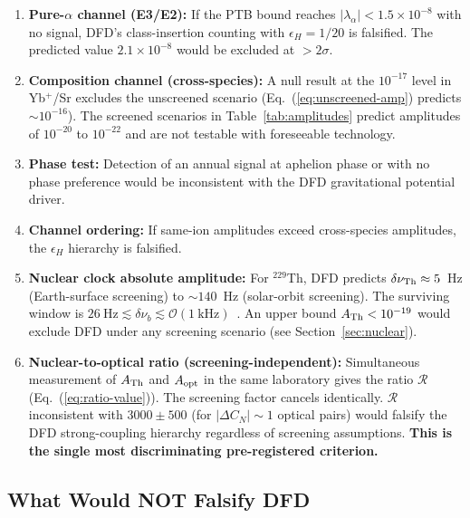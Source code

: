 \documentclass[twocolumn,showpacs,preprintnumbers,amsmath,amssymb,prd]{revtex4-2}
\begin{document}
\begin{enumerate}
\item \textbf{Pure-$\alpha$ channel (E3/E2):} If the PTB bound
  reaches $|\lambda_\alpha| < 1.5 \times 10^{-8}$ with no signal,
  DFD's class-insertion counting with $\epsilon_H = 1/20$ is
  falsified.  The predicted value $2.1 \times 10^{-8}$ would be
  excluded at $>2\sigma$.

\item \textbf{Composition channel (cross-species):} A null result
  at the $10^{-17}$ level in Yb$^+$/Sr excludes the unscreened
  scenario (Eq.~(\ref{eq:unscreened-amp}) predicts $\sim 10^{-16}$).
  The screened scenarios in Table~\ref{tab:amplitudes} predict
  amplitudes of $10^{-20}$ to $10^{-22}$ and are not testable
  with foreseeable technology.

\item \textbf{Phase test:} Detection of an annual signal at
  aphelion phase or with no phase preference would be
  inconsistent with the DFD gravitational potential driver.

\item \textbf{Channel ordering:} If same-ion amplitudes exceed
  cross-species amplitudes, the $\epsilon_H$ hierarchy is
  falsified.

\item \textbf{Nuclear clock absolute amplitude:} For $^{229}$Th,
  DFD predicts $\delta\nu_{\rm Th} \approx 5$~Hz (Earth-surface
  screening) to $\sim 140$~Hz (solar-orbit screening).  The
  surviving window is
  $26~\text{Hz} \lesssim \delta\nu_b \lesssim \mathcal{O}(1~\text{kHz})$~\cite{Ooi2026}.
  An upper bound $A_{\rm Th} < 10^{-19}$ would exclude DFD under
  any screening scenario (see Section~\ref{sec:nuclear}).

\item \textbf{Nuclear-to-optical ratio (screening-independent):}
  Simultaneous measurement of $A_{\rm Th}$ and $A_{\rm opt}$ in the
  same laboratory gives the ratio $\mathcal{R}$
  (Eq.~(\ref{eq:ratio-value})).  The screening factor cancels
  identically.  $\mathcal{R}$ inconsistent with
  $3000 \pm 500$ (for $|\Delta C_N| \sim 1$ optical pairs) would
  falsify the DFD strong-coupling hierarchy regardless of
  screening assumptions.  \textbf{This is the single most
  discriminating pre-registered criterion.}
\end{enumerate}

\subsection{What Would NOT Falsify DFD}
\end{document}
